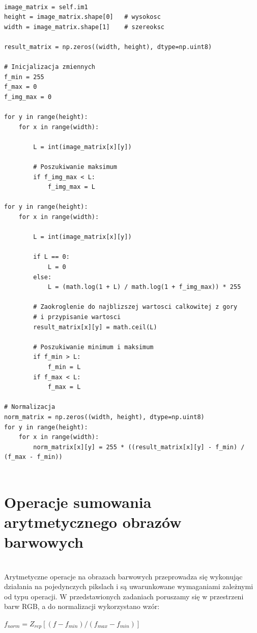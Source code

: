 \documentclass[final,a4paper,openany,12pt]{mwbk}
\begin{document}
\begin{lstlisting}[caption=Logarytmowanie obrazu szarego]

image_matrix = self.im1
height = image_matrix.shape[0]   # wysokosc
width = image_matrix.shape[1]    # szereoksc

result_matrix = np.zeros((width, height), dtype=np.uint8)

# Inicjalizacja zmiennych
f_min = 255
f_max = 0
f_img_max = 0

for y in range(height):
    for x in range(width):  

        L = int(image_matrix[x][y]) 

        # Poszukiwanie maksimum
        if f_img_max < L:
            f_img_max = L

for y in range(height):
    for x in range(width):  

        L = int(image_matrix[x][y]) 

        if L == 0:
            L = 0
        else:
            L = (math.log(1 + L) / math.log(1 + f_img_max)) * 255

        # Zaokroglenie do najblizszej wartosci calkowitej z gory
        # i przypisanie wartosci
        result_matrix[x][y] = math.ceil(L)

        # Poszukiwanie minimum i maksimum
        if f_min > L:
            f_min = L
        if f_max < L:
            f_max = L

# Normalizacja
norm_matrix = np.zeros((width, height), dtype=np.uint8)
for y in range(height):
    for x in range(width):
        norm_matrix[x][y] = 255 * ((result_matrix[x][y] - f_min) / (f_max - f_min))


\end{lstlisting}


\chapter{Operacje sumowania arytmetycznego obrazów barwowych}
\hfill\\
\indent
Arytmetyczne operacje na obrazach barwowych przeprowadza się wykonując działania na pojedynczych pikslach i są uwarunkowane wymaganiami zależnymi od typu operacji. 
W przedstawionych zadaniach poruszamy się w przestrzeni barw RGB, a do normalizacji wykorzystano wzór:

	\begin{center}
		$ f_{norm} = Z_{rep}[(f - f_{min}) / (f_{max} - f_{min})] $
	\end{center}
\end{document}

